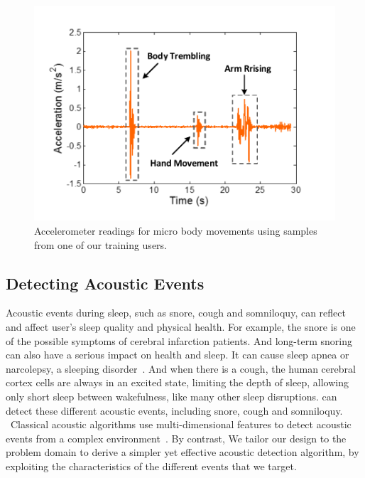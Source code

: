 \begin{figure}[!t]
\centering
      \includegraphics[width=0.43\linewidth]{Figures/Micromovement.pdf}
  \caption{Accelerometer readings for micro body movements using samples from one of our training users.}\label{fig:micro-move}
\end{figure}



\subsection{ Detecting Acoustic Events \label{sec:acoustic}}
Acoustic events during sleep, such as snore, cough and somniloquy, can reflect and affect user's sleep quality and physical health. For example, the snore is one of the possible symptoms of cerebral infarction patients.  And long-term snoring can also have a serious impact on health and sleep. It can cause sleep apnea or narcolepsy, a sleeping disorder~\cite{snoring2016,snoring2013}. And when there is a cough, the human cerebral cortex cells are always in an excited state, limiting the depth of sleep, allowing only short sleep between wakefulness, like many other sleep disruptions. {\systemname} can detect these different acoustic events, including snore, cough and somniloquy. \ Classical acoustic algorithms use multi-dimensional features to detect acoustic events from a complex environment~\cite{gu2016sleep}. By contrast, We tailor our design to the problem domain to derive a simpler yet effective acoustic detection algorithm, by exploiting the characteristics of the different events that we target.


